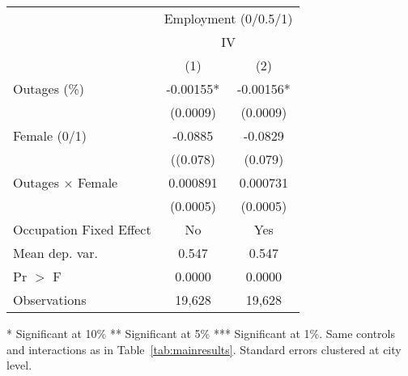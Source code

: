 \documentclass[12pt]{article}
\begin{document}
\begin{table}[htbp]
\begin{adjustwidth}{-0.4in}{-0.4in}
\begin{minipage}[t]{0.45\textwidth}
\begin{tabular}{lcc}
        & \multicolumn{2}{c}{Employment (0/0.5/1)} \\
        \cline{2-3}
        & \multicolumn{2}{c}{IV} \\
        & (1) & (2) \\
        \hline
        Outages (\%) 
  & -0.00155* 
  &  -0.00156*\\
& (0.0009) & (0.0009) \\[6pt]
Female (0/1)
  & -0.0885 
  &  -0.0829\\
& ((0.078) & (0.079) \\[6pt]
Outages $\times$ Female
  &  0.000891
  &   0.000731\\
 & (0.0005) & (0.0005) \\[6pt]
\midrule
Occupation Fixed Effect
  &  No
  &  Yes \\
\midrule
Mean dep. var.
  &  0.547
  &  0.547 \\
Pr $>$ F & 0.0000 & 0.0000 \\
Observations  
  & 19,628
  & 19,628\\
        \hline
    \end{tabular}  
        \begin{flushleft}
        \scriptsize
        * Significant at 10\% ** Significant at 5\% *** Significant at 1\%. Same controls and interactions as in Table~\ref{tab:mainresults}. Standard errors clustered at city level.
        \end{flushleft}
    \end{minipage}
      \end{adjustwidth}
\end{table}
\end{document}
